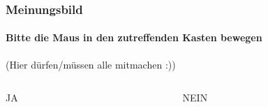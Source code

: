 \documentclass[12pt,aspectratio=169]{beamer}
\begin{document}
    \begin{frame}
        \frametitle{Meinungsbild}
        \framesubtitle{Bitte die Maus in den zutreffenden Kasten bewegen}

        (Hier dürfen/müssen alle mitmachen :))

        \bigskip

        \begin{columns}

            \begin{column}{0.5\textwidth}
                \centering
                JA
                \bigskip

            \end{column}

            \begin{column}{0.5\textwidth}
                \centering
                NEIN
                \bigskip

            \end{column}

        \end{columns}
    \end{frame}
\end{document}
